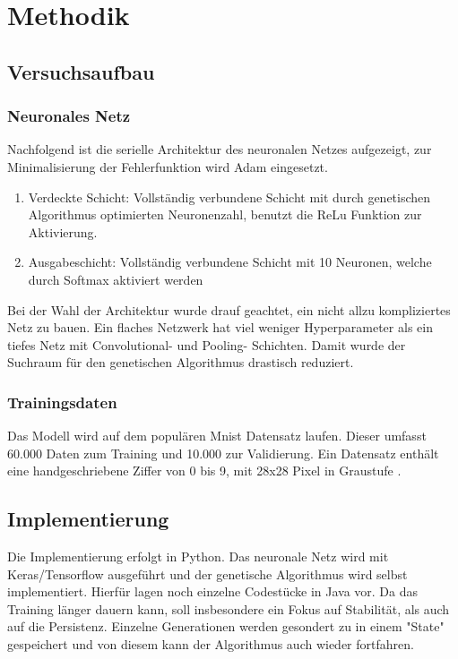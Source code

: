 \chapter{Methodik}
\section{Versuchsaufbau}
\subsection{Neuronales Netz}
Nachfolgend ist die serielle Architektur des neuronalen Netzes aufgezeigt, zur Minimalisierung der Fehlerfunktion wird Adam eingesetzt. 
\begin{enumerate}
	\item Verdeckte Schicht: Vollständig verbundene Schicht mit durch genetischen Algorithmus optimierten Neuronenzahl, benutzt die ReLu Funktion zur Aktivierung.
	\item Ausgabeschicht: Vollständig verbundene Schicht mit 10 Neuronen, welche durch Softmax aktiviert werden
\end{enumerate}
Bei der Wahl der Architektur wurde drauf geachtet, ein nicht allzu kompliziertes Netz zu bauen. Ein flaches Netzwerk hat viel weniger Hyperparameter als ein tiefes Netz mit Convolutional- und Pooling- Schichten. Damit wurde der Suchraum für den genetischen Algorithmus drastisch reduziert.

\subsection{Trainingsdaten}
Das Modell wird auf dem populären Mnist Datensatz laufen. Dieser umfasst 60.000 Daten zum Training und 10.000 zur Validierung. Ein Datensatz enthält eine handgeschriebene Ziffer von 0 bis 9, mit 28x28 Pixel in Graustufe \parencite{noauthor_mnist_nodate}.

\section{Implementierung}
Die Implementierung erfolgt in Python. Das neuronale Netz wird mit Keras/Tensorflow ausgeführt und der genetische Algorithmus wird selbst implementiert. Hierfür lagen noch einzelne Codestücke in Java vor. Da das Training länger dauern kann, soll insbesondere ein Fokus auf Stabilität, als auch auf die Persistenz. Einzelne Generationen werden gesondert zu in einem "State" gespeichert und von diesem kann der Algorithmus auch wieder fortfahren.

